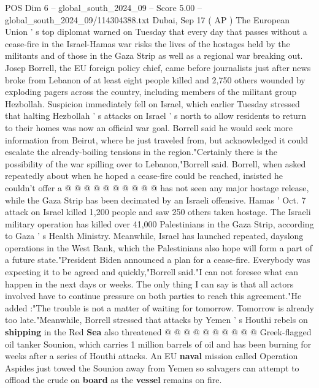 \begin{textsample}{POS Dim 6 – global\_south\_2024\_09 – Score 5.00 – global\_south\_2024\_09/114304388.txt}  \label{ex:f6_pos_433}
Dubai, Sep 17 ( AP ) The European Union ' s top diplomat warned on Tuesday that every day that passes without a cease-fire in the Israel-Hamas war risks the lives of the hostages held by the militants and of those in the Gaza Strip as well as a regional war breaking out.
Josep Borrell, the EU foreign policy chief, came before journalists just after news broke from Lebanon of at least eight people killed and 2,750 others wounded by exploding pagers across the country, including members of the militant group Hezbollah.
Suspicion immediately fell on Israel, which earlier Tuesday stressed that halting Hezbollah ' s attacks on Israel ' s north to allow residents to return to their homes was now an official war goal.
Borrell said he would seek more information from Beirut, where he just traveled from, but acknowledged it could escalate the already-boiling tensions in the region."Certainly there is the possibility of the war spilling over to Lebanon,"Borrell said.
Borrell, when asked repeatedly about when he hoped a cease-fire could be reached, insisted he couldn't offer a @ @ @ @ @ @ @ @ @ @ has not seen any major hostage release, while the Gaza Strip has been decimated by an Israeli offensive.
Hamas ' Oct. 7 attack on Israel killed 1,200 people and saw 250 others taken hostage.
The Israeli military operation has killed over 41,000 Palestinians in the Gaza Strip, according to Gaza ' s Health Ministry.
Meanwhile, Israel has launched repeated, dayslong operations in the West Bank, which the Palestinians also hope will form a part of a future state."President Biden announced a plan for a cease-fire.
Everybody was expecting it to be agreed and quickly,"Borrell said."I can not foresee what can happen in the next days or weeks.
The only thing I can say is that all actors involved have to continue pressure on both parties to reach this agreement."He added :"The trouble is not a matter of waiting for tomorrow.
Tomorrow is already too late."Meanwhile, Borrell stressed that attacks by Yemen ' s Houthi rebels on \textbf{shipping} in the Red \textbf{Sea} also threatened @ @ @ @ @ @ @ @ @ @ Greek-flagged oil tanker Sounion, which carries 1 million barrels of oil and has been burning for weeks after a series of Houthi attacks.
An EU \textbf{naval} mission called Operation Aspides just towed the Sounion away from Yemen so salvagers can attempt to offload the crude on \textbf{board} as the \textbf{vessel} remains on fire.

\end{textsample}
